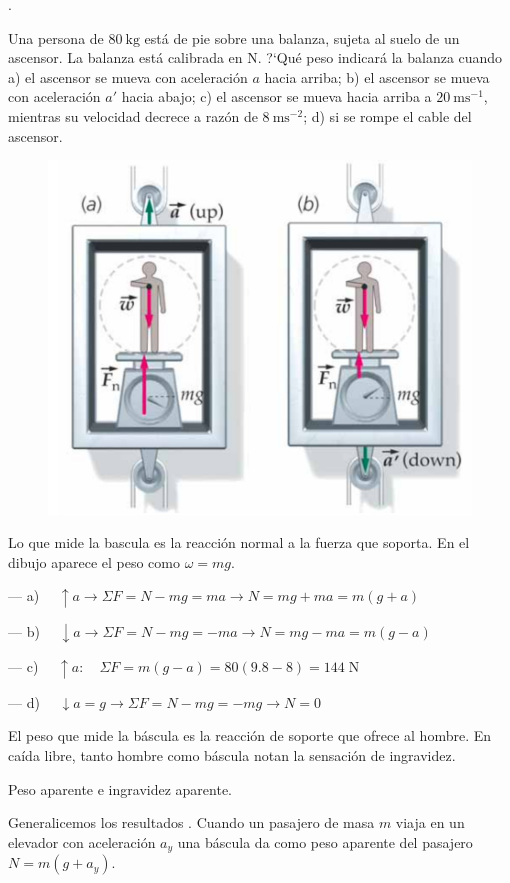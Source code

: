 \begin{prob}.
\begin{multicols}{2}
Una persona de $80 \ \mathrm{kg}$ está de pie sobre una balanza, sujeta al suelo de un ascensor. La balanza está calibrada en $\mathrm{N}$. ?`Qué peso indicará la balanza cuando a) el ascensor se mueva con aceleración $a$ hacia arriba; b) el ascensor se mueva con aceleración $a'$ hacia abajo; c) el ascensor se mueva hacia arriba a $20\ \mathrm{ms}^{-1}$, mientras su velocidad decrece a razón de $8\ \mathrm{ms}^{-2}$; d) si se rompe el cable del ascensor.
	\begin{figure}[H]
	\centering
	\includegraphics[width=.6\textwidth]{imagenes/imagenes03/T03IM21.png}
	\end{figure}
\end{multicols}
\end{prob}
Lo que mide la bascula es la reacción normal a la fuerza que soporta. En el dibujo aparece el peso como $\omega=mg$.

--- a) $\quad \uparrow a \to \Sigma F= N-mg = ma \to N=mg+ma=m(g+a)$

--- b) $\quad \downarrow a \to \Sigma F= N-mg = -ma \to N=mg-ma=m(g-a)$

--- c) $\quad \uparrow a:\quad \Sigma F=m(g-a)=80(9.8-8)=144\; \mathrm{N}$

--- d) $\quad \downarrow a=g \to \Sigma F= N-mg = -mg \to N=0$

El peso que mide la báscula es la reacción de soporte que ofrece al hombre. En caída libre, tanto hombre como báscula notan la sensación de ingravidez. 


\footnotesize{\textsf{Peso aparente e ingravidez aparente.}}
 
\footnotesize{\textsf{Generalicemos los resultados . Cuando un pasajero de masa $m$  viaja en un elevador con aceleración $a_y$  una báscula da como peso aparente del pasajero $N=m(g+a_y)$.}}

